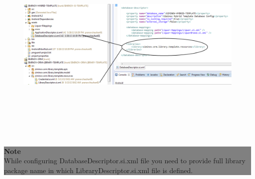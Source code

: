 \begin{enumerate}
		\begin{figure}[!htbp]
			\centering
				\includegraphics[height=10cm]{Resources/siminov_hybrid_template_library_configure.png}
		\end{figure}

		\begin{center}
			\colorbox{grey}{
			\parbox[t]{.8\linewidth}{
				\fontsize{11pt}{11pt}\selectfont %
				\vspace*{0.1cm} %
		
				\hfill \textbf{Note} \\
					While configuring DatabaseDescriptor.si.xml file you need to provide full library package name in which LibraryDescriptor.si.xml file is defined.

				\vspace*{0.0cm} %
				}
			}

		\end{center}



\end{enumerate}
